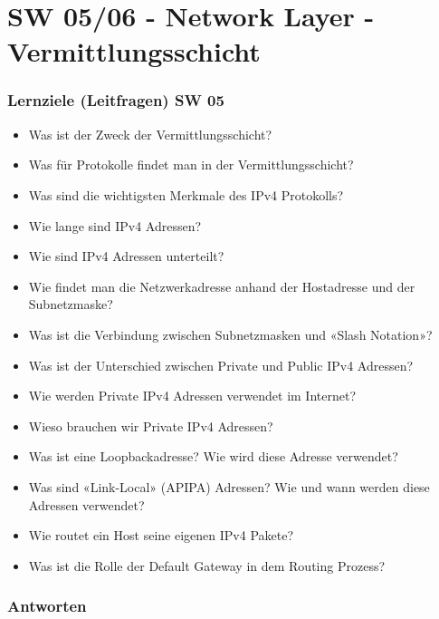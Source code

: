 \part{SW 05/06 - Network Layer - Vermittlungsschicht}
\section{Lernziele (Leitfragen) SW 05}
\begin{itemize}
    \item Was ist der Zweck der Vermittlungsschicht?
    \item Was für Protokolle findet man in der Vermittlungsschicht?
    \item Was sind die wichtigsten Merkmale des IPv4 Protokolls?
    \item Wie lange sind IPv4 Adressen?
    \item Wie sind IPv4 Adressen unterteilt?
    \item Wie findet man die Netzwerkadresse anhand der Hostadresse und der Subnetzmaske?
    \item Was ist die Verbindung zwischen Subnetzmasken und «Slash Notation»?
    \item Was ist der Unterschied zwischen Private und Public IPv4 Adressen?
    \item Wie werden Private IPv4 Adressen verwendet im Internet?
    \item Wieso brauchen wir Private IPv4 Adressen?
    \item Was ist eine Loopbackadresse? Wie wird diese Adresse verwendet?
    \item Was sind «Link-Local» (APIPA) Adressen? Wie und wann werden diese Adressen verwendet?
    \item Wie routet ein Host seine eigenen IPv4 Pakete?
    \item Was ist die Rolle der Default Gateway in dem Routing Prozess?
\end{itemize}

\section{Antworten}
